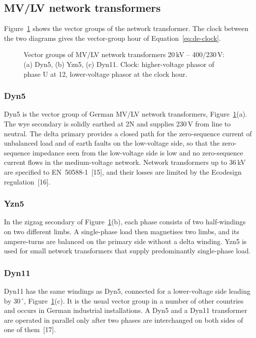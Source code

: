 \subsection{MV/LV network transformers}
\label{sec:de-network}

Figure~\ref{fig:de-network} shows the vector groups of the network
transformer. The clock between the two diagrams gives the vector-group hour
of Equation~\eqref{eq:de-clock}.

\begin{figure}[!ht]
  \centering
  
  \caption{Vector groups of MV/LV network transformers 20\,kV --
  400/230\,V: (a) Dyn5, (b) Yzn5, (c) Dyn11. Clock: higher-voltage phasor
  of phase U at 12, lower-voltage phasor at the clock hour.}
  \label{fig:de-network}
\end{figure}

\subsubsection{Dyn5}
Dyn5 is the vector group of German MV/LV network transformers,
Figure~\ref{fig:de-network}(a). The wye secondary is solidly earthed at 2N
and supplies 230\,V from line to neutral. The delta primary provides a
closed path for the zero-sequence current of unbalanced load and of earth
faults on the low-voltage side, so that the zero-sequence impedance seen
from the low-voltage side is low and no zero-sequence current flows in the
medium-voltage network. Network transformers up to 36\,kV are specified to
EN~50588-1~[15], and their losses are limited by the Ecodesign
regulation~[16].

\subsubsection{Yzn5}
In the zigzag secondary of Figure~\ref{fig:de-network}(b), each phase
consists of two half-windings on two different limbs. A single-phase load
then magnetises two limbs, and its ampere-turns are balanced on the primary
side without a delta winding. Yzn5 is used for small network transformers
that supply predominantly single-phase load.

\subsubsection{Dyn11}
Dyn11 has the same windings as Dyn5, connected for a lower-voltage side
leading by 30\,$^{\circ}$, Figure~\ref{fig:de-network}(c). It is the usual
vector group in a number of other countries and occurs in German industrial
installations. A Dyn5 and a Dyn11 transformer are operated in parallel only
after two phases are interchanged on both sides of one of them~[17].
\FloatBarrier
